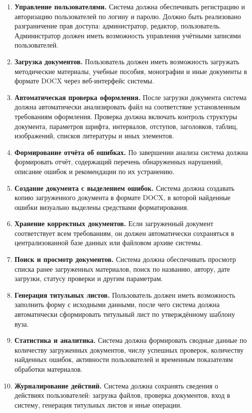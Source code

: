 \begin{enumerate}
	\item \textbf{Управление пользователями.} Система должна обеспечивать регистрацию и авторизацию пользователей по логину и паролю. Должно быть реализовано разграничение прав доступа: администратор, редактор, пользователь. Администратор должен иметь возможность управления учётными записями пользователей.
	
	\item \textbf{Загрузка документов.} Пользователь должен иметь возможность загружать методические материалы, учебные пособия, монографии и иные документы в формате DOCX через веб-интерфейс системы.
	
	\item \textbf{Автоматическая проверка оформления.} После загрузки документа система должна автоматически анализировать файл на соответствие установленным требованиям оформления. Проверка должна включать контроль структуры документа, параметров шрифта, интервалов, отступов, заголовков, таблиц, изображений, списков литературы и иных элементов.
	
	\item \textbf{Формирование отчёта об ошибках.} По завершении анализа система должна формировать отчёт, содержащий перечень обнаруженных нарушений, описание ошибок и рекомендации по их устранению.
	
	\item \textbf{Создание документа с выделением ошибок.} Система должна создавать копию загруженного документа в формате DOCX, в которой найденные ошибки визуально выделены средствами форматирования.
	
	\item \textbf{Хранение корректных документов.} Если загруженный документ соответствует всем требованиям, он должен автоматически сохраняться в централизованной базе данных или файловом архиве системы.
	
	\item \textbf{Поиск и просмотр документов.} Система должна обеспечивать просмотр списка ранее загруженных материалов, поиск по названию, автору, дате загрузки, статусу проверки и другим параметрам.
	
	\item \textbf{Генерация титульных листов.} Пользователь должен иметь возможность заполнить форму с исходными данными, после чего система должна автоматически сформировать титульный лист по утверждённому шаблону вуза.
	
	\item \textbf{Статистика и аналитика.} Система должна формировать сводные данные по количеству загруженных документов, числу успешных проверок, количеству найденных ошибок, активности пользователей и временным показателям обработки материалов.
	
	\item \textbf{Журналирование действий.} Система должна сохранять сведения о действиях пользователей: загрузка файлов, проверка документов, вход в систему, генерация титульных листов и иные операции.
\end{enumerate}

